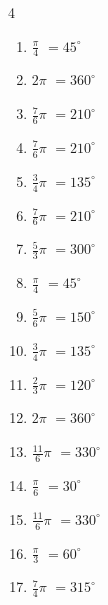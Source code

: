 \begin{multicols}{4}
\begin{enumerate}
  \item $\displaystyle \frac{\pi}{4}$
        $\displaystyle =45^{\circ}$

  \item $\displaystyle 2\pi$
        $\displaystyle =360^{\circ}$

  \item $\displaystyle \frac{7}{6}\pi$
        $\displaystyle =210^{\circ}$

  \item $\displaystyle \frac{7}{6}\pi$
        $\displaystyle =210^{\circ}$

  \item $\displaystyle \frac{3}{4}\pi$
        $\displaystyle =135^{\circ}$

  \item $\displaystyle \frac{7}{6}\pi$
        $\displaystyle =210^{\circ}$

  \item $\displaystyle \frac{5}{3}\pi$
        $\displaystyle =300^{\circ}$

\columnbreak %

  \item $\displaystyle \frac{\pi}{4}$
        $\displaystyle =45^{\circ}$

  \item $\displaystyle \frac{5}{6}\pi$
        $\displaystyle =150^{\circ}$

  \item $\displaystyle \frac{3}{4}\pi$
        $\displaystyle =135^{\circ}$

  \item $\displaystyle \frac{2}{3}\pi$
        $\displaystyle =120^{\circ}$

  \item $\displaystyle 2\pi$
        $\displaystyle =360^{\circ}$

  \item $\displaystyle \frac{11}{6}\pi$
        $\displaystyle =330^{\circ}$

  \item $\displaystyle \frac{\pi}{6}$
        $\displaystyle =30^{\circ}$

  \item $\displaystyle \frac{11}{6}\pi$
        $\displaystyle =330^{\circ}$

  \item $\displaystyle \frac{\pi}{3}$
        $\displaystyle =60^{\circ}$

  \item $\displaystyle \frac{7}{4}\pi$
        $\displaystyle =315^{\circ}$


\end{enumerate}
\end{multicols}
